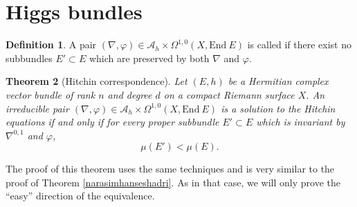 \documentclass[12pt,a4paper]{book}
\newtheorem{thm}{Theorem}[section]
\theoremstyle{definition} \newtheorem{defn}[thm]{Definition}
\theoremstyle{definition} \newtheorem{ejemplo}[thm]{Example}
\theoremstyle{remark} \newtheorem{rem}[thm]{Remark}
\def\AA{\mathscr{A}}
\def\End{\mathrm{End}}
\let\emph\relax
\begin{document}
	  \section{Higgs bundles}
	  \begin{defn}
	    A pair $(\nabla,\varphi) \in \AA_h \times \Omega^{1,0}(X,\End\ E)$ is called \emph{irreducible} if there exist no subbundles $E'\subset E$ which are preserved by both $\nabla$ and $\varphi$. 
	  \end{defn}
	  \begin{thm}[Hitchin correspondence] \label{Hitchin correspondence}
	    Let $(E,h)$ be a Hermitian complex vector bundle of rank $n$ and degree $d$ on a compact Riemann surface $X$.
	    An irreducible pair $(\nabla ,\varphi) \in \AA_h \times \Omega^{1,0}(X,\End\ E)$ is a solution to the Hitchin equations if and only if for every proper subbundle $E'\subset E$ which is invariant by $\nabla^{0,1}$ and $\varphi$,
	    \begin{equation*}
	      \mu(E')<\mu(E).
	    \end{equation*}
	  \end{thm}
	  The proof of this theorem uses the same techniques and is very similar to the proof of Theorem \ref{narasimhanseshadri}. As in that case, we will only prove the ``easy'' direction of the equivalence.
\end{document}
